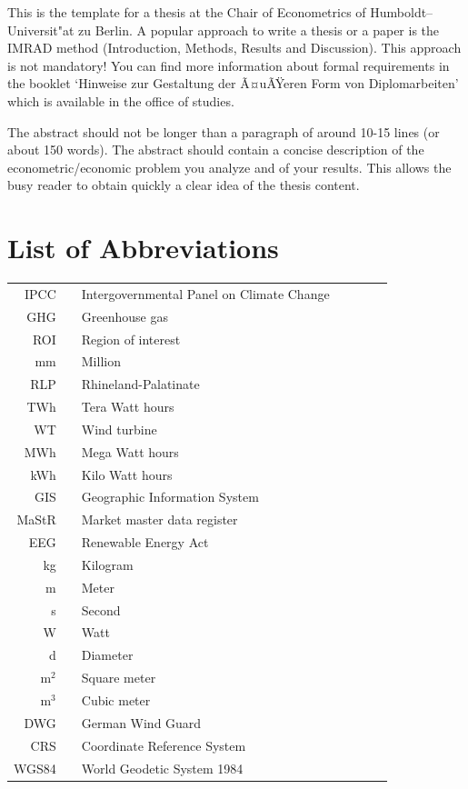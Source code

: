 \documentclass[a4paper,11pt]{article}
\begin{document}
This is the template for a thesis at the Chair of Econometrics of
Humboldt--Universit"at zu Berlin. A popular approach to write a thesis or a
paper is the IMRAD method (Introduction, Methods, Results and Discussion). This
approach is not mandatory! You can find more information about formal
requirements in the booklet `Hinweise zur Gestaltung der Ã¤uÃŸeren Form von
Diplomarbeiten' which is available in the office of studies.

The abstract should not be longer than a paragraph of around 10-15 lines (or
about 150 words). The abstract should contain a concise description of the
econometric/economic problem you analyze and of your results. This allows the
busy reader to obtain quickly a clear idea of the thesis content.

\newpage
\hypertarget{list-of-abbreviations}{%
\section*{List of Abbreviations}\label{list-of-abbreviations}}
\begin{tabular}{rp{0.2cm}lp{1cm}rp{0.2cm}l}
    IPCC    & &  Intergovernmental Panel on Climate Change \\
    GHG & & Greenhouse gas \\
    ROI     & &  Region of interest \\
    mm      & &  Million \\   
    RLP     & &  Rhineland-Palatinate \\
    TWh     & &  Tera Watt hours  \\
    WT      & &  Wind turbine  \\
    MWh     & &  Mega Watt hours \\
    kWh     & &  Kilo Watt hours \\
    GIS     & &  Geographic Information System \\
    MaStR   & &  Market master data register \\
    EEG     & &  Renewable Energy Act \\
    kg      & &  Kilogram \\
    m       & &  Meter \\
    s       & &  Second \\
    W       & &  Watt \\
    d       & &  Diameter \\
    m$^2$   & &  Square meter \\
    m$^3$   & &  Cubic meter \\
    DWG     & &  German Wind Guard \\
    CRS     & &  Coordinate Reference System \\
    WGS84   & &  World Geodetic System 1984 \\ 
    
\end{tabular}
\end{document}
